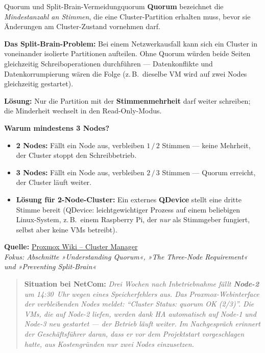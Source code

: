 \documentclass[a4paper,10pt,addpoints]{exam}
\begin{document}
\begin{infoBox}{Quorum und Split-Brain-Vermeidung}{quorum}
  \textbf{Quorum} bezeichnet die \emph{Mindestanzahl an Stimmen}, die eine
  Cluster-Partition erhalten muss, bevor sie Änderungen am Cluster-Zustand
  vornehmen darf.

  \medskip
  \textbf{Das Split-Brain-Problem:}
  Bei einem Netzwerkausfall kann sich ein Cluster in voneinander isolierte
  Partitionen aufteilen.
  Ohne Quorum würden beide Seiten gleichzeitig Schreiboperationen durchführen ---
  Datenkonflikte und Datenkorrumpierung wären die Folge
  (z.\,B.\ dieselbe VM wird auf zwei Nodes gleichzeitig gestartet).

  \medskip
  \textbf{Lösung:} Nur die Partition mit der \textbf{Stimmenmehrheit} darf weiter
  schreiben; die Minderheit wechselt in den Read-Only-Modus.

  \medskip
  \textbf{Warum mindestens 3 Nodes?}
  \begin{itemize}
    \item \textbf{2 Nodes:} Fällt ein Node aus, verbleiben $1\,/\,2$ Stimmen ---
      keine Mehrheit, der Cluster stoppt den Schreibbetrieb.
    \item \textbf{3 Nodes:} Fällt ein Node aus, verbleiben $2\,/\,3$ Stimmen ---
      Quorum erreicht, der Cluster läuft weiter.
    \item \textbf{Lösung für 2-Node-Cluster:}
      Ein externes \textbf{QDevice} stellt eine dritte Stimme bereit
      (QDevice: leichtgewichtiger Prozess auf einem beliebigen Linux-System,
      z.\,B.\ einem Raspberry Pi, der \emph{nur} als Stimmgeber fungiert,
      selbst aber keine VMs betreibt).
  \end{itemize}

  \medskip\small
  \textbf{Quelle:} \href{https://pve.proxmox.com/wiki/Cluster_Manager}{Proxmox Wiki -- Cluster Manager}\\
  \hspace*{0.4em}\textit{Fokus: Abschnitte »Understanding Quorum«,
    »The Three-Node Requirement« und »Preventing Split-Brain«}
\end{infoBox}

\begin{quote}
  \textbf{Situation bei NetCom:}
  \itshape
  Drei Wochen nach Inbetriebnahme fällt \textbf{Node-2} um 14:30~Uhr wegen eines
  Speicherfehlers aus.
  Das Proxmox-Webinterface der verbleibenden Nodes meldet:
  \emph{\enquote{Cluster Status: quorum OK (2/3)}}.
  Die VMs, die auf Node-2 liefen, werden dank HA automatisch auf Node-1 und Node-3
  neu gestartet --- der Betrieb läuft weiter.
  Im Nachgespräch erinnert der Geschäftsführer daran, dass er vor dem Projektstart
  vorgeschlagen hatte, aus Kostengründen nur zwei Nodes einzusetzen.
\end{quote}
\end{document}
